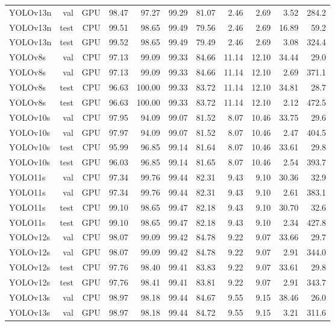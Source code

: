 \begin{table}[t]
{\begin{tabular}{lrrrrrrrrrr}
YOLOv13n & val & GPU & 98.47 & 97.27 & 99.29 & 81.07 & 2.46 & 2.69 & 3.52 & 284.2 \\
YOLOv13n & test & CPU & 99.51 & 98.65 & 99.49 & 79.56 & 2.46 & 2.69 & 16.89 & 59.2 \\
YOLOv13n & test & GPU & 99.52 & 98.65 & 99.49 & 79.49 & 2.46 & 2.69 & 3.08 & 324.4 \\
YOLOv8s & val & CPU & 97.13 & 99.09 & 99.33 & 84.66 & 11.14 & 12.10 & 34.44 & 29.0 \\
YOLOv8s & val & GPU & 97.13 & 99.09 & 99.33 & 84.66 & 11.14 & 12.10 & 2.69 & 371.1 \\
YOLOv8s & test & CPU & 96.63 & 100.00 & 99.33 & 83.72 & 11.14 & 12.10 & 34.81 & 28.7 \\
YOLOv8s & test & GPU & 96.63 & 100.00 & 99.33 & 83.72 & 11.14 & 12.10 & 2.12 & 472.5 \\
YOLOv10s & val & CPU & 97.95 & 94.09 & 99.07 & 81.52 & 8.07 & 10.46 & 33.75 & 29.6 \\
YOLOv10s & val & GPU & 97.97 & 94.09 & 99.07 & 81.52 & 8.07 & 10.46 & 2.47 & 404.5 \\
YOLOv10s & test & CPU & 95.99 & 96.85 & 99.14 & 81.64 & 8.07 & 10.46 & 33.61 & 29.8 \\
YOLOv10s & test & GPU & 96.03 & 96.85 & 99.14 & 81.65 & 8.07 & 10.46 & 2.54 & 393.7 \\
YOLO11s & val & CPU & 97.34 & 99.76 & 99.44 & 82.31 & 9.43 & 9.10 & 30.36 & 32.9 \\
YOLO11s & val & GPU & 97.34 & 99.76 & 99.44 & 82.31 & 9.43 & 9.10 & 2.61 & 383.1 \\
YOLO11s & test & CPU & 99.10 & 98.65 & 99.47 & 82.18 & 9.43 & 9.10 & 30.70 & 32.6 \\
YOLO11s & test & GPU & 99.10 & 98.65 & 99.47 & 82.18 & 9.43 & 9.10 & 2.34 & 427.8 \\
YOLOv12s & val & CPU & 98.07 & 99.09 & 99.42 & 84.78 & 9.22 & 9.07 & 33.66 & 29.7 \\
YOLOv12s & val & GPU & 98.07 & 99.09 & 99.42 & 84.78 & 9.22 & 9.07 & 2.91 & 344.0 \\
YOLOv12s & test & CPU & 97.76 & 98.40 & 99.41 & 83.83 & 9.22 & 9.07 & 33.61 & 29.8 \\
YOLOv12s & test & GPU & 97.76 & 98.41 & 99.41 & 83.81 & 9.22 & 9.07 & 2.91 & 343.7 \\
YOLOv13s & val & CPU & 98.97 & 98.18 & 99.44 & 84.67 & 9.55 & 9.15 & 38.46 & 26.0 \\
YOLOv13s & val & GPU & 98.97 & 98.18 & 99.44 & 84.72 & 9.55 & 9.15 & 3.21 & 311.6 \\

\end{tabular}}
\end{table}
